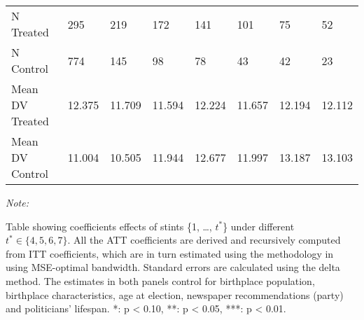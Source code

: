 \begin{table}[!h]
\begin{threeparttable}
\begin{tabular}[t]{llllllll}
\hspace{1em}N Treated & 295 & 219 & 172 & 141 & 101 & 75 & 52\\
\hspace{1em}N Control & 774 & 145 & 98 & 78 & 43 & 42 & 23\\
\hspace{1em}Mean DV Treated & 12.375 & 11.709 & 11.594 & 12.224 & 11.657 & 12.194 & 12.112\\
\hspace{1em}Mean DV Control & 11.004 & 10.505 & 11.944 & 12.677 & 11.997 & 13.187 & 13.103\\
\bottomrule
\end{tabular}
\begin{tablenotes}[para]
\item \textit{Note: } 
\item Table showing coefficients effects of stints \{1, \dots, $t^*$\} under different $t^* \in \{4,5,6,7\}$. All the ATT coefficients are derived and recursively computed from ITT coefficients, which are in turn estimated using the methodology in \citep{cattaneo2019practical} using MSE-optimal bandwidth. Standard errors are calculated using the delta method. The estimates in both panels control for birthplace population, birthplace characteristics, age at election, newspaper recommendations (party) and politicians' lifespan. *: p < 0.10, **: p < 0.05, ***: p < 0.01. 
\end{tablenotes}
\end{threeparttable}
\end{table}
